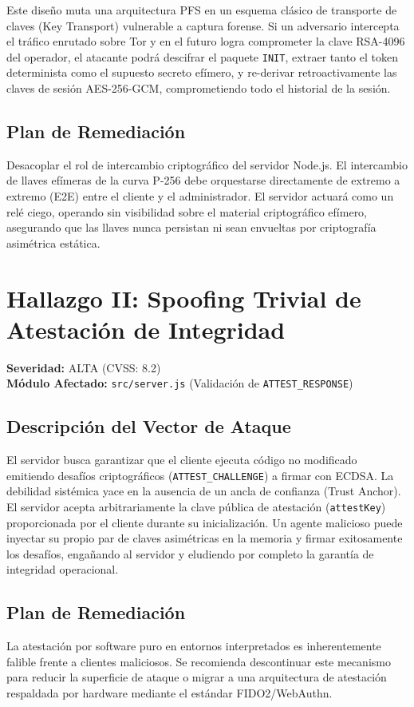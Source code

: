 \documentclass[12pt, a4paper]{article}
\begin{document}
Este diseño muta una arquitectura PFS en un esquema clásico de transporte de claves (Key Transport) vulnerable a captura forense. Si un adversario intercepta el tráfico enrutado sobre Tor y en el futuro logra comprometer la clave RSA-4096 del operador, el atacante podrá descifrar el paquete \texttt{INIT}, extraer tanto el token determinista como el supuesto secreto efímero, y re-derivar retroactivamente las claves de sesión AES-256-GCM, comprometiendo todo el historial de la sesión.

\subsection{Plan de Remediación}
Desacoplar el rol de intercambio criptográfico del servidor Node.js. El intercambio de llaves efímeras de la curva P-256 debe orquestarse directamente de extremo a extremo (E2E) entre el cliente y el administrador. El servidor actuará como un relé ciego, operando sin visibilidad sobre el material criptográfico efímero, asegurando que las llaves nunca persistan ni sean envueltas por criptografía asimétrica estática.

\section{Hallazgo II: Spoofing Trivial de Atestación de Integridad}
\textbf{Severidad:} ALTA (CVSS: 8.2)\\
\textbf{Módulo Afectado:} \texttt{src/server.js} (Validación de \texttt{ATTEST\_RESPONSE})

\subsection{Descripción del Vector de Ataque}
El servidor busca garantizar que el cliente ejecuta código no modificado emitiendo desafíos criptográficos (\texttt{ATTEST\_CHALLENGE}) a firmar con ECDSA. La debilidad sistémica yace en la ausencia de un ancla de confianza (Trust Anchor). El servidor acepta arbitrariamente la clave pública de atestación (\texttt{attestKey}) proporcionada por el cliente durante su inicialización. Un agente malicioso puede inyectar su propio par de claves asimétricas en la memoria y firmar exitosamente los desafíos, engañando al servidor y eludiendo por completo la garantía de integridad operacional.

\subsection{Plan de Remediación}
La atestación por software puro en entornos interpretados es inherentemente falible frente a clientes maliciosos. Se recomienda descontinuar este mecanismo para reducir la superficie de ataque o migrar a una arquitectura de atestación respaldada por hardware mediante el estándar FIDO2/WebAuthn.
\end{document}
